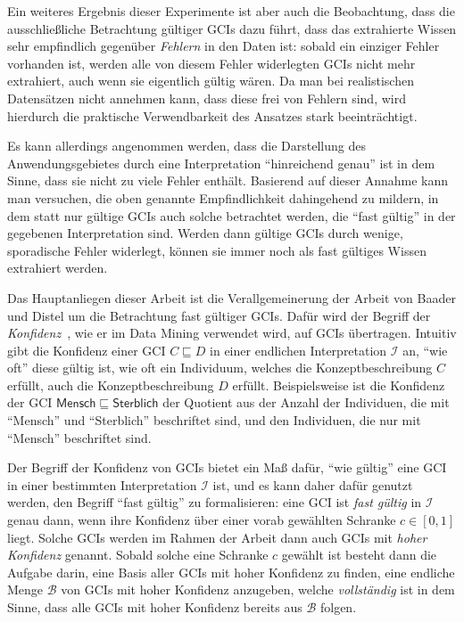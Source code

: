 \documentclass[ngerman,fleqn,DIV=12]{scrartcl}
\begin{document}
Ein weiteres Ergebnis dieser Experimente ist aber auch die Beobachtung, dass die
ausschließliche Betrachtung gültiger GCIs dazu führt, dass das extrahierte Wissen sehr
empfindlich gegenüber \emph{Fehlern} in den Daten ist: sobald ein einziger Fehler
vorhanden ist, werden alle von diesem Fehler widerlegten GCIs nicht mehr extrahiert, auch
wenn sie eigentlich gültig wären.  Da man bei realistischen Datensätzen nicht annehmen
kann, dass diese frei von Fehlern sind, wird hierdurch die praktische Verwendbarkeit des
Ansatzes stark beeinträchtigt.

Es kann allerdings angenommen werden, dass die Darstellung des Anwendungsgebietes durch
eine Interpretation \enquote{hinreichend genau} ist in dem Sinne, dass sie nicht zu viele
Fehler enthält.  Basierend auf dieser Annahme kann man versuchen, die oben genannte
Empfindlichkeit dahingehend zu mildern, in dem statt nur gültige GCIs auch solche
betrachtet werden, die \enquote{fast gültig} in der gegebenen Interpretation sind.  Werden
dann gültige GCIs durch wenige, sporadische Fehler widerlegt, können sie immer noch als
fast gültiges Wissen extrahiert werden.

Das Hauptanliegen dieser Arbeit ist die Verallgemeinerung der Arbeit von Baader und Distel
um die Betrachtung fast gültiger GCIs.  Dafür wird der Begriff der
\emph{Konfidenz}~\cite{arules:agrawal:association-rules}, wie er im Data Mining verwendet
wird, auf GCIs übertragen.  Intuitiv gibt die Konfidenz einer GCI $C \sqsubseteq D$ in
einer endlichen Interpretation $\mathcal{I}$ an, \enquote{wie oft} diese gültig ist, \dh
wie oft ein Individuum, welches die Konzeptbeschreibung $C$ erfüllt, auch die
Konzeptbeschreibung $D$ erfüllt.  Beispielsweise ist die Konfidenz der GCI
$\mathsf{Mensch} \sqsubseteq \mathsf{Sterblich}$ der Quotient aus der Anzahl der
Individuen, die mit \enquote{\textsf{Mensch}} und \enquote{\textsf{Sterblich}} beschriftet
sind, und den Individuen, die nur mit \enquote{\textsf{Mensch}} beschriftet sind.

Der Begriff der Konfidenz von GCIs bietet ein Maß dafür, \enquote{wie gültig} eine GCI in
einer bestimmten Interpretation $\mathcal{I}$ ist, und es kann daher dafür genutzt werden,
den Begriff \enquote{fast gültig} zu formalisieren: eine GCI ist \emph{fast gültig} in
$\mathcal{I}$ genau dann, wenn ihre Konfidenz über einer vorab gewählten Schranke $c \in
[0,1]$ liegt.  Solche GCIs werden im Rahmen der Arbeit dann auch GCIs mit \emph{hoher
  Konfidenz} genannt.  Sobald solche eine Schranke $c$ gewählt ist besteht dann die
Aufgabe darin, eine Basis aller GCIs mit hoher Konfidenz zu finden, \dh eine endliche
Menge $\mathcal{B}$ von GCIs mit hoher Konfidenz anzugeben, welche \emph{vollständig} ist
in dem Sinne, dass alle GCIs mit hoher Konfidenz bereits aus $\mathcal{B}$ folgen.
\end{document}
